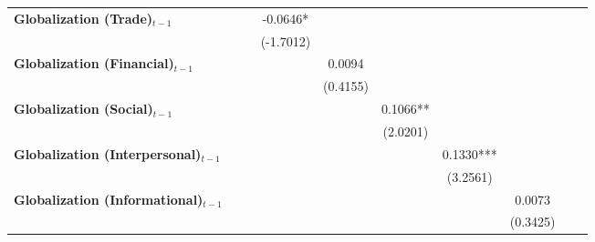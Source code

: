 \begin{center}
\begin{tabular}{lccccccccc}
\textbf{Globalization (Trade)$_{t-1}$}             &                    &                    &      -0.0646*      &                    &                    &                    &                    &                    &                     \\
\textbf{ }                         &                    &                    &     (-1.7012)      &                    &                    &                    &                    &                    &                     \\
\textbf{Globalization (Financial)$_{t-1}$}             &                    &                    &                    &       0.0094       &                    &                    &                    &                    &                     \\
\textbf{ }                         &                    &                    &                    &      (0.4155)      &                    &                    &                    &                    &                     \\
\textbf{Globalization (Social)$_{t-1}$}             &                    &                    &                    &                    &      0.1066**      &                    &                    &                    &                     \\
\textbf{ }                         &                    &                    &                    &                    &      (2.0201)      &                    &                    &                    &                     \\
\textbf{Globalization (Interpersonal)$_{t-1}$}             &                    &                    &                    &                    &                    &     0.1330***      &                    &                    &                     \\
\textbf{ }                         &                    &                    &                    &                    &                    &      (3.2561)      &                    &                    &                     \\
\textbf{Globalization (Informational)$_{t-1}$}             &                    &                    &                    &                    &                    &                    &       0.0073       &                    &                     \\
\textbf{ }                         &                    &                    &                    &                    &                    &                    &      (0.3425)      &                    &                     \\

\end{tabular}
\end{center}
